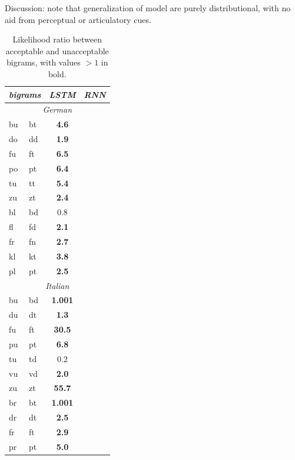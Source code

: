 Discussion: note that generalization of model are purely
distributional, with no aid from perceptual or articulatory cues.



\begin{table}[t]
  \begin{center}
    \begin{tabular}{ll|cc}
      \multicolumn{2}{c}{\emph{bigrams}}&\emph{LSTM}&\emph{RNN}\\
      \hline
      \multicolumn{4}{c}{\emph{German}}\\
      \hline
           bu &  bt &  \textbf{ 4.6} \\
           do &  dd &  \textbf{ 1.9} \\
           fu &  ft &  \textbf{ 6.5} \\
           po &  pt &  \textbf{ 6.4} \\
           tu &  tt &  \textbf{ 5.4} \\
           zu &  zt &  \textbf{ 2.4} \\ \hline
    bl &  bd & 0.8 \\
           fl &  fd &  \textbf{ 2.1} \\
           fr &  fn &  \textbf{ 2.7} \\
           kl &  kt &  \textbf{ 3.8} \\
           pl &  pt &  \textbf{ 2.5} \\

      \hline
      \multicolumn{4}{c}{\emph{Italian}}\\
      \hline
	    bu & bd & \textbf{ 1.001} \\
	    du & dt & \textbf{ 1.3} \\
	    fu & ft & \textbf{ 30.5} \\
	    pu & pt & \textbf{ 6.8} \\
	    tu & td &  0.2 \\
	    vu & vd & \textbf{ 2.0} \\
	    zu & zt & \textbf{ 55.7} \\ \hline
	    br & bt & \textbf{ 1.001} \\
	    dr & dt & \textbf{ 2.5} \\
	    fr & ft & \textbf{ 2.9} \\
	    pr & pt & \textbf{ 5.0} \\
    \end{tabular}
  \end{center}
  \caption{\label{tab:phonotactics-results} Likelihood ratio between acceptable and unacceptable bigrams,    with values $>1$ in bold.}
\end{table}



